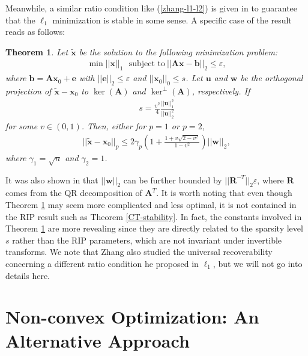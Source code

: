 \documentclass[11pt]{article}
\numberwithin{equation}{section}
\theoremstyle{plain}
\newtheorem{Th}{Theorem}[section]
\theoremstyle{definition}
\def\A{{\mathbf A}}
\def\x{{\mathbf x}}
\def\b{{\mathbf b}}
\def\e{{\varepsilon}}
\def\u{{\mathbf{u}}}
\def\w{{\mathbf{w}}}
\begin{document}
Meanwhile, a similar ratio condition like (\ref{zhang-l1-l2}) is given in \cite{zhang2013theory} to guarantee that the $\ell_1$ minimization is stable in some sense. A specific case of the result reads as follows:
\begin{Th}\label{zhang-stability}
Let $\tilde{\x}$ be the solution to the following minimization problem:
\begin{align*}
\min ||\x||_1 \ \ \ \text{subject to}\ ||\A\x-\b||_2\leq\e,
\end{align*}
where $\b = \A\x_0+\mathbf{e}$ with $||\mathbf{e}||_2\leq\e$ and $||\x_0||_0\leq s$. Let $\u$ and $\w$ be the orthogonal projection of $\tilde{\x}-\x_0$ to $\ker(\A)$ and $\ker^\perp(\A)$, respectively. If 
\begin{align*}
s=\frac{v^2}{4}\frac{||\u||_1^2}{||\u||_2^2}
\end{align*}
for some $v\in (0, 1)$. Then, either for $p=1$ or $p=2$,
\begin{align*}
||\tilde{\x}-\x_0||_p\leq 2\gamma_p\left(1+\frac{1+v\sqrt{2-v^2}}{1-v^2}\right)||\w||_2, 
\end{align*}
where $\gamma_1=\sqrt{n}$ and $\gamma_2=1$. 
\end{Th}
It was also shown in \cite{zhang2013theory} that $||\w||_2$ can be further bounded by $||\mathbf{R}^{-T}||_2\e$, where $\mathbf{R}$ comes from the QR decomposition of $\A^T$. It is worth noting that even though Theorem \ref{zhang-stability} may seem more complicated and less optimal, it is not contained in the RIP result such as Theorem \ref{CT-stability}. In fact, the constants involved in Theorem \ref{zhang-stability} are more revealing since they are directly related to the sparsity level $s$ rather than the RIP parameters, which are not invariant under invertible transforms. We note that Zhang also studied the universal recoverability concerning a different ratio condition he proposed in $\ell_1$, but we will not go into details here.    



\section{Non-convex Optimization: An Alternative Approach}\label{555}
\end{document}
